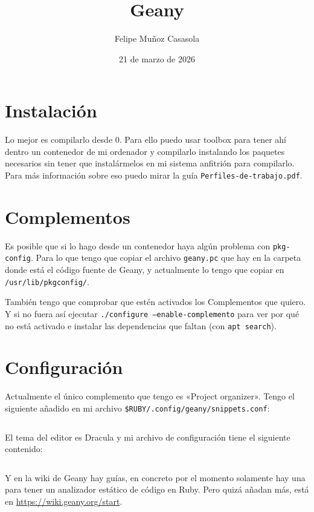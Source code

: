 \documentclass{article}
\title{Geany}
\author{Felipe Muñoz Casasola}
\date{21 de marzo de 2026}
\begin{document}
    \maketitle
    \clearpage
    
    \section{Instalación}
    Lo mejor es compilarlo desde 0. Para ello puedo usar toolbox para
    tener ahí dentro un contenedor de mi ordenador y compilarlo
    instalando los paquetes necesarios sin tener que instalármelos en
    mi sistema anfitrión para compilarlo. Para más información sobre
    eso puedo mirar la guía \texttt{Perfiles-de-trabajo.pdf}.

    \section{Complementos}
    Es posible que si lo hago desde un contenedor haya algún problema
    con \texttt{pkg-config}. Para lo que tengo que copiar el archivo
    \texttt{geany.pc} que hay en la carpeta donde está el código
    fuente de Geany, y actualmente lo tengo que copiar en
    \texttt{/usr/lib/pkgconfig/}.

    También tengo que comprobar que estén activados los Complementos
    que quiero. Y si no fuera así ejecutar
    \texttt{./configure --enable-complemento} para ver por qué no
    está activado e instalar las dependencias que faltan (con
    \texttt{apt search}).

    \section{Configuración}
    Actualmente el único complemento que tengo es «Project organizer».
    Tengo el siguiente añadido en mi archivo
    \texttt{\$RUBY/.config/geany/snippets.conf}:

    \inputminted[breaklines, breakanywhere, breaksymbolleft="", breaksymbolright="", breakanywheresymbolpre="", breakanywheresymbolpost=""]
    {systemd}{inc/snippets.conf}

    El tema del editor es Dracula y mi archivo de configuración tiene el
    siguiente contenido:

    \inputminted[breaklines, breakanywhere, breaksymbolleft="", breaksymbolright="", breakanywheresymbolpre="", breakanywheresymbolpost=""]
    {systemd}{inc/geany.conf}

    Y en la wiki de Geany hay guías, en concreto por el momento
    solamente hay una para tener un analizador estático de código
    en Ruby. Pero quizá añadan más, está en \href{https://wiki.geany.org/start}
    {https://wiki.geany.org/start}.
\end{document}
